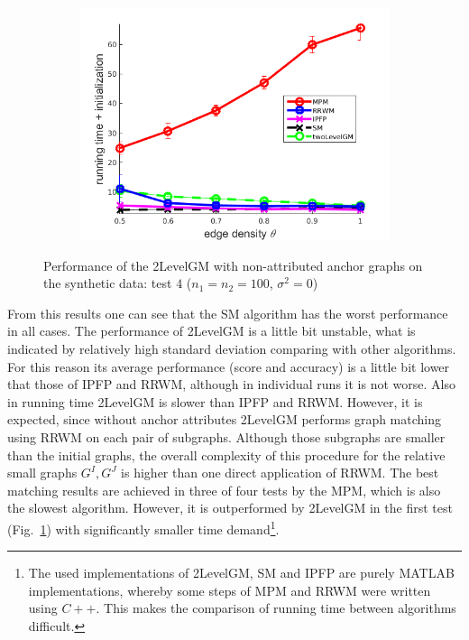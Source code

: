 \begin{figure}[h]
\begin{subfigure}[b]{0.3\textwidth}
			\includegraphics[scale=0.25]{"chapter3/fig/SyntheticTest/no_descr/Results_v4.3.3/Test4/time_summary_avg10t"} 
		\end{subfigure} 	
	\caption[Performance of the 2LevelGM with non-attributed anchor graphs on the synthetic data (test $4$)]{Performance of the 2LevelGM with non-attributed anchor graphs on the synthetic data: test $4$ ($n_1=n_2=100$, $\sigma^2=0$)}
	\label{fig:synTest4_ver433}
\end{figure}
\FloatBarrier
From this results one can see that the SM algorithm has the worst performance in all cases. The performance of 2LevelGM is a little bit unstable, what is indicated by relatively high standard deviation comparing with other algorithms. For this reason its average performance (score and accuracy) is a little bit lower that those of IPFP and RRWM, although in individual runs it is not worse. Also in running time 2LevelGM is slower than IPFP and RRWM. However, it is expected, since without anchor attributes 2LevelGM performs graph matching using RRWM on each pair of subgraphs. Although those subgraphs are smaller than the initial graphs, the overall complexity of this procedure for the relative small graphs $G^I,G^J$ is higher than one direct application of RRWM. The best matching results are achieved in three of four tests by the MPM, which is also the slowest algorithm. However, it is outperformed by 2LevelGM in the first test (Fig.~\ref{fig:synTest4_ver433}) with significantly smaller time demand\footnote{The used implementations of 2LevelGM, SM and IPFP are purely MATLAB implementations, whereby some steps of MPM and RRWM were written using $C++$. This makes the comparison of running time between algorithms difficult.}.

